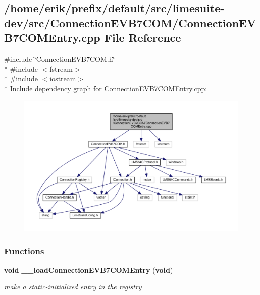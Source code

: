 \subsection{/home/erik/prefix/default/src/limesuite-\/dev/src/\+Connection\+E\+V\+B7\+C\+O\+M/\+Connection\+E\+V\+B7\+C\+O\+M\+Entry.cpp File Reference}
\label{ConnectionEVB7COMEntry_8cpp}
{\ttfamily \#include \char`\"{}Connection\+E\+V\+B7\+C\+O\+M.\+h\char`\"{}}\\*
{\ttfamily \#include $<$fstream$>$}\\*
{\ttfamily \#include $<$iostream$>$}\\*
Include dependency graph for Connection\+E\+V\+B7\+C\+O\+M\+Entry.\+cpp\+:
\nopagebreak
\begin{figure}[H]
\begin{center}
\leavevmode
\includegraphics[width=350pt]{d0/d9e/ConnectionEVB7COMEntry_8cpp__incl}
\end{center}
\end{figure}
\subsubsection*{Functions}
\begin{DoxyCompactItemize}
\item 
{\bf void} {\bf \+\_\+\+\_\+load\+Connection\+E\+V\+B7\+C\+O\+M\+Entry} ({\bf void})
\begin{DoxyCompactList}\small\item\em make a static-\/initialized entry in the registry \end{DoxyCompactList}\end{DoxyCompactItemize}
